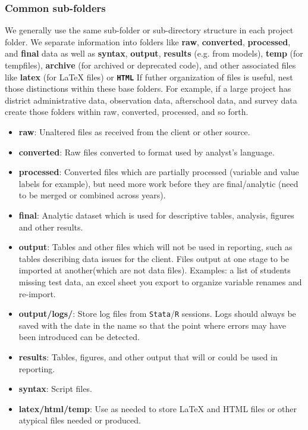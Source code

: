 \subsubsection{Common sub-folders}
We generally use the same sub-folder or sub-directory structure in each project folder. We separate information into folders like \textbf{raw}, \textbf{converted}, \textbf{processed}, and \textbf{final} data as well as \textbf{syntax}, \textbf{output}, \textbf{results} (e.g. from models), \textbf{temp} (for tempfiles), \textbf{archive} (for archived or deprecated code), and other associated files like \textbf{latex} (for \LaTeX{} files) or \textbf{\texttt{HTML}} If futher organization of files is useful, nest those distinctions within these base folders. For example, if a large project has district administrative data, observation data, afterschool data, and survey data create those folders within raw, converted, processed, and so forth.
\begin{itemize}
	\item\textbf{raw}: Unaltered files as received from the client or other source.
	\item\textbf{converted}: Raw files converted to format used by analyst's language.
	\item\textbf{processed}: Converted files which are partially processed (variable and value labels for example), but need more work before they are final/analytic (need to be merged or combined across years).
	\item\textbf{final}: Analytic dataset which is used for descriptive tables, analysis, figures and other results.
	\item\textbf{output}: Tables and other files which will not be used in reporting, such as tables describing data issues for the client. Files output at one stage to be imported at another(which are not data files). Examples: a list of students missing test data, an excel sheet you export to organize variable renames and re-import.
	\item\textbf{output/logs/}: Store log files from \texttt{Stata}/\texttt{R} sessions. Logs should always be saved with the date in the name so that the point where errors may have been introduced can be detected.
	\item\textbf{results}: Tables, figures, and other output that will or could be used in reporting.
	\item\textbf{syntax}: Script files.
	\item\textbf{latex/html/temp}: Use as needed to store \LaTeX{} and HTML files or other atypical files needed or produced.
\end{itemize}

